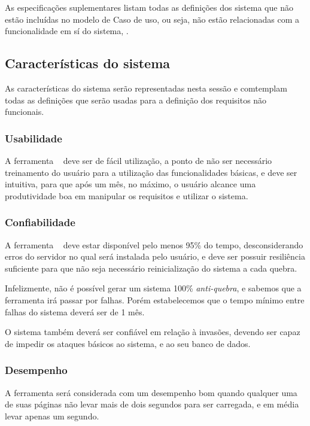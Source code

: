 As especificações suplementares listam todas as definições dos sistema que não estão incluídas no modelo de Caso de uso, ou seja, não estão relacionadas com a funcionalidade em sí do sistema, \cite{rup}.

\subsection{Características do sistema}
\label{subSection:suplementares_Caract_sistema}
As características do sistema serão representadas nesta sessão e comtemplam todas as definições que serão usadas para a definição dos requisitos não funcionais.

\subsubsection{Usabilidade}
	
	A ferramenta \nomeferramenta~ deve ser de fácil utilização, a ponto de não ser necessário treinamento do usuário para a utilização das funcionalidades básicas, e deve ser intuitiva, para que após um mês, no máximo, o usuário alcance uma produtividade boa em manipular os requisitos e utilizar o sistema.

\subsubsection{Confiabilidade}

	A ferramenta \nomeferramenta~ deve estar disponível pelo menos 95\% do tempo, desconsiderando erros do servidor no qual será instalada pelo usuário, e deve ser possuir resiliência suficiente para que não seja necessário reinicialização do sistema a cada quebra.

	Infelizmente, não é possível gerar um sistema 100\% \textit{anti-quebra}, e sabemos que a ferramenta irá passar por falhas. Porém estabelecemos que o tempo mínimo entre falhas do sistema deverá ser de 1 mês.

	O sistema também deverá ser confiável em relação à invasões, devendo ser capaz de impedir os ataques básicos ao sistema, e ao seu banco de dados.

\subsubsection{Desempenho}

	A ferramenta será considerada com um desempenho bom quando qualquer uma de suas páginas não levar mais de dois segundos para ser carregada, e em média levar apenas um segundo.


